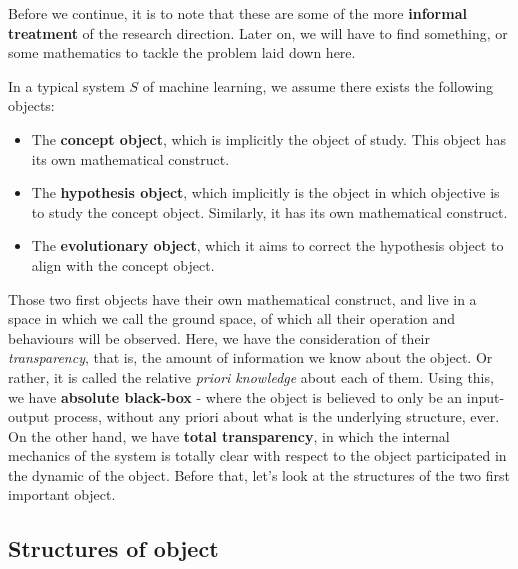 Before we continue, it is to note that these are some of the more \textbf{informal treatment} of the research direction. Later on, we will have to find something, or some mathematics to tackle the problem laid down here. 

In a typical system $S$ of machine learning, we assume there exists the following objects: 

\begin{itemize}[topsep=1pt,itemsep=0.5pt]
    \item The \textbf{concept object}, which is implicitly the object of study. This object has its own mathematical construct. 
    \item The \textbf{hypothesis object}, which implicitly is the object in which objective is to study the concept object. Similarly, it has its own mathematical construct. 
    \item The \textbf{evolutionary object}, which it aims to correct the hypothesis object to align with the concept object. 
\end{itemize}
Those two first objects have their own mathematical construct, and live in a space in which we call the ground space, of which all their operation and behaviours will be observed. Here, we have the consideration of their \textit{transparency}, that is, the amount of information we know about the object. Or rather, it is called the relative \textit{priori knowledge} about each of them. Using this, we have \textbf{absolute black-box} - where the object is believed to only be an input-output process, without any priori about what is the underlying structure, ever. On the other hand, we have \textbf{total transparency}, in which the internal mechanics of the system is totally clear with respect to the object participated in the dynamic of the object. Before that, let's look at the structures of the two first important object. 
\subsection{Structures of object}


